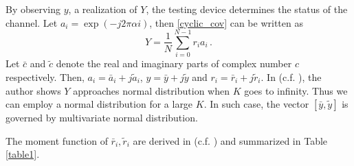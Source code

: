 By observing $y$, a realization  of $Y$, the testing device determines the status of the channel.
Let $a_i = \exp(-j2\pi\alpha i)$, then \eqref{cyclic_cov} can be written as
\begin{equation}
  Y = \frac{1}{N}\sum_{i=0}^{N-1} r_ia_i\,.
  \label{cyclic_cov_2}
\end{equation}
Let $\bar{c}$ and $\tilde{c}$ denote the real and imaginary parts of complex number $c$ respectively. Then, $a_i = \bar{a}_i + j\tilde{a}_i$, $y = \bar{y}+j\tilde{y}$  and $r_i = \bar{r}_i + j\tilde{r}_i$. In (c.f. ), the author shows $Y$ approaches normal distribution when $K$ goes to infinity. Thus we can employ a normal distribution for a large $K$. In such case, the vector $[\bar{y}, \tilde{y}]$ is governed by multivariate normal distribution. 

The moment function of $\bar{r}_i, \tilde{r}_i$ are derived in (c.f. ) and summarized in Table \ref{table1}.
